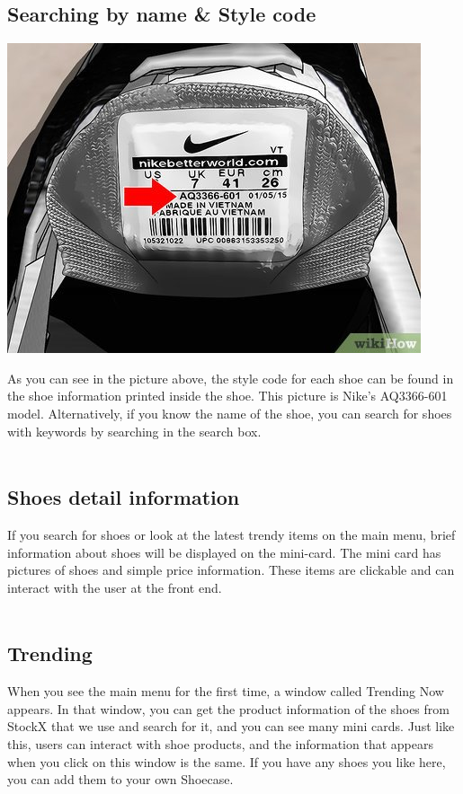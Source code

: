 \documentclass[conference]{IEEEtran}
\begin{document}
\begin{enumerate}
\subsection{Searching by name \& Style code}
\centerline{\includegraphics[scale=2]{pics/Nike_Stylecode.jpg}}
As you can see in the picture above, the style code for each shoe can be found in the shoe information printed inside the shoe. This picture is Nike's AQ3366-601 model. Alternatively, if you know the name of the shoe, you can search for shoes with keywords by searching in the search box.\\\\
\subsection{Shoes detail information}
If you search for shoes or look at the latest trendy items on the main menu, brief information about shoes will be displayed on the mini-card. The mini card has pictures of shoes and simple price information. These items are clickable and can interact with the user at the front end.\\\\
\subsection{Trending}
When you see the main menu for the first time, a window called Trending Now appears. In that window, you can get the product information of the shoes from StockX that we use and search for it, and you can see many mini cards. Just like this, users can interact with shoe products, and the information that appears when you click on this window is the same. If you have any shoes you like here, you can add them to your own Shoecase.\\\\

\end{enumerate}
\end{document}
